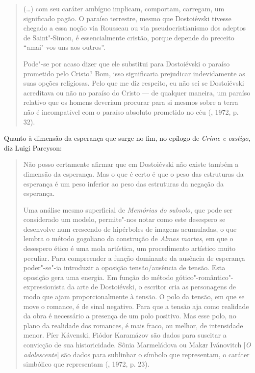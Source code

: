\begin{quote}
(\ldots{}) com seu caráter ambíguo implicam, comportam, carregam, um
significado pagão. O paraíso terrestre, mesmo que Dostoiévski tivesse
chegado a essa noção via Rousseau ou via pseudocristianismo dos adeptos
de Saint"-Simon, é essencialmente cristão, porque depende do preceito
``amai"-vos uns aos outros''.

Pode"-se por acaso dizer que ele substitui para Dostoiévski o paraíso
prometido pelo Cristo? Bom, isso significaria prejudicar indevidamente
as suas opções religiosas. Pelo que me diz respeito, eu não sei se
Dostoiévski acreditava ou não no paraíso do Cristo --- de qualquer
maneira, um paraíso relativo que os homens deveriam procurar para si
mesmos sobre a terra não é incompatível com o paraíso absoluto prometido
no céu (, 1972, p. 32).
\end{quote}

Quanto à dimensão da esperança que surge no fim, no epílogo de
\emph{Crime e castigo}, diz Luigi Pareyson:

\begin{quote}
Não posso certamente afirmar que em Dostoiévski não existe também a
dimensão da esperança. Mas o que é certo é que o peso das estruturas da
esperança é um peso inferior ao peso das estruturas da negação da
esperança.

Uma análise mesmo superficial de \emph{Memórias do subsolo}, que pode
ser considerado um modelo, permite"-nos notar como este desespero se
desenvolve num crescendo de hipérboles de imagens acumuladas, o que
lembra o método gogoliano da construção de \emph{Almas mortas}, em que o
desespero ético é uma mola artística, um procedimento artístico muito
peculiar. Para compreender a função dominante da ausência de esperança
poder"-se"-ia introduzir a oposição tensão/ausência de tensão. Esta
oposição gera uma energia. Em função do método
gótico"-romântico"-expressionista da arte de Dostoiévski, o escritor cria
as personagens de modo que ajam proporcionalmente à tensão. O polo da
tensão, em que se move o romance, é de sinal negativo. Para que a tensão
aja como realidade da obra é necessário a presença de um polo positivo.
Mas esse polo, no plano da realidade dos romances, é mais fraco, ou
melhor, de intensidade menor. Píer Kávenski, Fiódor Karamázov são dados
para suscitar a convicção de sua historicidade. Sônia Marmeládova ou
Makаr Ivánovitch [\emph{O adolescente}] são dados para sublinhar o
símbolo que representam, o caráter simbólico que representam (, 1972, p. 23).
\end{quote}

